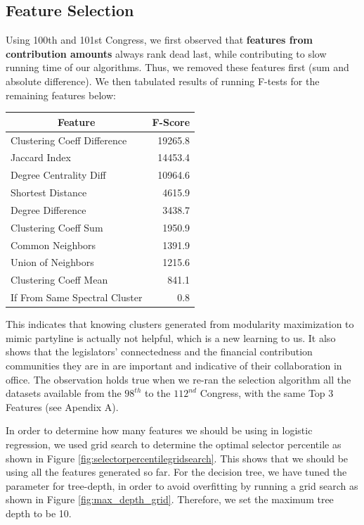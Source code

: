 \documentclass[12pt,twocolumn]{article}
\begin{document}
\subsection{Feature Selection}
Using 100th and 101st Congress, we first observed that \textbf{features from contribution amounts} always rank dead last, while contributing to slow running time of our algorithms. Thus, we removed these features first (sum and absolute difference). We then tabulated results of running F-tests for the remaining features below: 

\begin{tabular}{|l|r|}
\hline
\multicolumn{1}{|c|}{Feature} & \multicolumn{1}{c|}{F-Score} \\ \hline
Clustering Coeff Difference   & 19265.8                \\ \hline
Jaccard Index                      & 14453.4                        \\ \hline
Degree Centrality Diff                    & 10964.6                        \\ \hline
Shortest Distance            & 4615.9                    \\ \hline
Degree Difference                 & 3438.7                        \\ \hline
Clustering Coeff Sum                & 1950.9                        \\ \hline
Common Neighbors            & 1391.9                        \\ \hline
Union of Neighbors             & 1215.6                     \\ \hline
Clustering Coeff Mean              &  841.1             \\ \hline
If From Same Spectral Cluster          & 0.8                      \\ \hline
\end{tabular}

This indicates that knowing clusters generated from modularity maximization to mimic partyline is actually not helpful, which is a new learning to us. It also shows that the legislators' connectedness and the financial contribution communities they are in are important and indicative of their collaboration in office. The observation holds true when we re-ran the selection algorithm all the datasets available from the $98^{th}$ to the $112^{nd}$ Congress, with the same Top 3 Features (see Apendix A).

In order to determine how many features we should be using in logistic regression, we used grid search to determine the optimal selector percentile as shown in Figure \ref{fig:selectorpercentilegridsearch}. This shows that we should be using all the features generated so far. 
For the decision tree, we have tuned the parameter for tree-depth, in order to avoid overfitting by running a grid search as shown in Figure \ref{fig:max_depth_grid}. Therefore, we set the maximum tree depth to be 10. 
\end{document}
